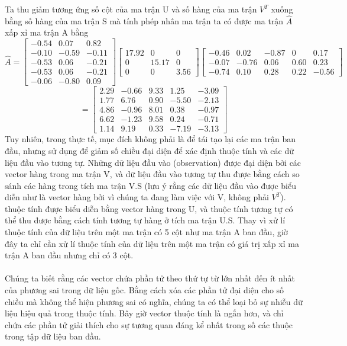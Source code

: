 Ta thu giảm tương ứng số cột của ma trận U và số hàng của ma trận $V^T$ xuống
bằng số hàng của ma trận S mà tính phép nhân ma trận ta có được ma trận
$\widehat{A}$ xấp xỉ ma trận A bằng
\[ \widehat{A} = 
\begin{bmatrix}
-0.54 & 0.07 & 0.82 \\
-0.10 & -0.59 & -0.11\\
-0.53 & 0.06 & -0.21\\
-0.53 & 0.06 & -0.21\\
-0.06 & -0.80 & 0.09
\end{bmatrix}
\begin{bmatrix}
17.92 & 0 & 0 \\
0 & 15.17 & 0 \\
0 & 0 & 3.56 
\end{bmatrix}
\begin{bmatrix}
-0.46 & 0.02 & -0.87 & 0 & 0.17 \\
-0.07 & -0.76 & 0.06 & 0.60 & 0.23 \\
-0.74 & 0.10 & 0.28 & 0.22 & -0.56
\end{bmatrix} 
\]
\[ = 
\begin{bmatrix}
2.29 & -0.66 & 9.33 & 1.25 & -3.09 \\
1.77 & 6.76 & 0.90 & -5.50 & -2.13 \\
4.86 & -0.96 & 8.01 & 0.38 & -0.97 \\
6.62 & -1.23 & 9.58 & 0.24 & -0.71 \\
1.14 & 9.19 & 0.33 & -7.19 & -3.13
\end{bmatrix} 
\]
Tuy nhiên, trong thực tế, mục đích không phải là để tái tạo lại các ma trận ban
đầu, nhưng sử dụng để giảm số chiều đại diện để xác định thuộc tính và các dữ
liệu đầu vào tương tự. Những dữ liệu đầu vào (observation) được đại diện bởi các
vector hàng trong ma trận V, và dữ liệu đầu vào tương tự thu được bằng cách so
sánh các hàng trong tích ma trận V.S (lưu ý rằng các dữ liệu đầu vào được biểu
diễn như là vector hàng bởi vì chúng ta đang làm việc với V, không phải $V^T$).
thuộc tính được biểu diễn bằng vector hàng trong U, và thuộc tính tương tự có
thể thu được bằng cách tính tương tự hàng ở tích ma trận U.S. Thay vì xử lí thuộc tính
của dữ liệu trên một ma trận có 5 cột như ma trận A ban đầu, giờ đây ta chỉ cần
xử lí thuộc tính của dữ liệu trên một ma trận có giá trị xấp xỉ ma trận A ban
đầu nhưng chỉ có 3 cột.\\\\     
Chúng ta biết rằng các vector chứa phần tử theo thứ tự từ lớn nhất đến ít nhất
của phương sai trong dữ liệu gốc. Bằng cách xóa các phần tử đại diện cho số
chiều mà không thể hiện phương sai có nghĩa, chúng ta có thể loại bỏ sự nhiễu dữ
liệu hiệu quả trong thuộc tính. Bây giờ vector thuộc tính là ngắn hơn, và chỉ
chứa các phần tử giải thích cho sự tương quan đáng kể nhất trong số các thuộc
trong tập dữ liệu ban đầu.

